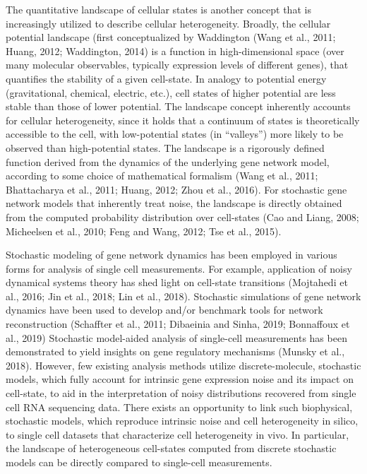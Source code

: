 The quantitative landscape of cellular states is another concept that is increasingly utilized to describe cellular heterogeneity. Broadly, the cellular potential landscape (first conceptualized by Waddington (Wang et al., 2011; Huang, 2012; Waddington, 2014) is a function in high-dimensional space (over many molecular observables, typically expression levels of different genes), that quantifies the stability of a given cell-state. In analogy to potential energy (gravitational, chemical, electric, etc.), cell states of higher potential are less stable than those of lower potential. The landscape concept inherently accounts for cellular heterogeneity, since it holds that a continuum of states is theoretically accessible to the cell, with low-potential states (in “valleys”) more likely to be observed than high-potential states. The landscape is a rigorously defined function derived from the dynamics of the underlying gene network model, according to some choice of mathematical formalism (Wang et al., 2011; Bhattacharya et al., 2011; Huang, 2012; Zhou et al., 2016). For stochastic gene network models that inherently treat noise, the landscape is directly obtained from the computed probability distribution over cell-states (Cao and Liang, 2008; Micheelsen et al., 2010; Feng and Wang, 2012; Tse et al., 2015).

Stochastic modeling of gene network dynamics has been employed in various forms for analysis of single cell measurements. For example, application of noisy dynamical systems theory has shed light on cell-state transitions (Mojtahedi et al., 2016; Jin et al., 2018; Lin et al., 2018). Stochastic simulations of gene network dynamics have been used to develop and/or benchmark tools for network reconstruction (Schaffter et al., 2011; Dibaeinia and Sinha, 2019; Bonnaffoux et al., 2019) Stochastic model-aided analysis of single-cell measurements has been demonstrated to yield insights on gene regulatory mechanisms (Munsky et al., 2018). However, few existing analysis methods utilize discrete-molecule, stochastic models, which fully account for intrinsic gene expression noise and its impact on cell-state, to aid in the interpretation of noisy distributions recovered from single cell RNA sequencing data. There exists an opportunity to link such biophysical, stochastic models, which reproduce intrinsic noise and cell heterogeneity in silico, to single cell datasets that characterize cell heterogeneity in vivo. In particular, the landscape of heterogeneous cell-states computed from discrete stochastic models can be directly compared to single-cell measurements.


